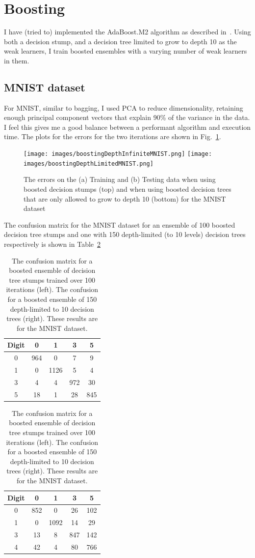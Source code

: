 \documentclass[5pt]{article}
\begin{document}
\section{Boosting}
I have (tried to) implemented the AdaBoost.M2 algorithm as described
in~\cite{freund1996experiments}. Using both a decision stump, and a decision
tree limited to grow to depth 10 as the weak learners, I train boosted
ensembles
with a varying number of weak learners in them.

\subsection{MNIST dataset}
For MNIST, similar to bagging, I used PCA to reduce dimensionality, retaining
enough principal component vectors that explain 90\% of the variance in the
data. I feel this gives me a good balance between a performant algorithm and
execution time.  The plots for the errors for the two iterations are shown in
Fig.~\ref{fig:errorsMNISTBoosting}.

\begin{figure}
  \texttt{[image: images/boostingDepthInfiniteMNIST.png]}
  \texttt{[image: images/boostingDepthLimitedMNIST.png]}
\label{fig:errorsMNISTBoosting}
\caption{The errors on the (a) Training and (b) Testing data when
  using boosted decision stumps (top) and when using boosted decision trees
that are only allowed to grow to depth 10 (bottom) for the MNIST dataset}
\end{figure}

The confusion matrix for the MNIST dataset for an ensemble of 100 boosted
decision tree stumps and one with 150 depth-limited (to 10 levels)
decision trees respectively is shown in Table~\ref{tab:confusionMNISTBoost}
\begin{table}
\centering
\begin{tabular}{ccccc}
\toprule
Digit & 0 & 1 & 3 & 5 \\
\midrule
0 & 964 & 0 & 7 & 9\\
1 & 0 & 1126 & 5 & 4\\
3 & 4 & 4 & 972 & 30\\
5 & 18 & 1 & 28 & 845\\
\bottomrule
\end{tabular}
\quad
\begin{tabular}{ccccc}
\toprule
Digit & 0 & 1 & 3 & 5\\
\midrule
0 & 852 & 0 & 26 & 102\\
1 & 0  & 1092 &  14 & 29\\
3 & 13 & 8 & 847 & 142\\
4 & 42 & 4 & 80 & 766\\
\bottomrule
\end{tabular}
\caption{The confusion matrix for a boosted ensemble of decision tree stumps
  trained over 100 iterations (left). The confusion for a boosted ensemble of
  150 depth-limited to 10 decision trees (right). These results are for the MNIST
dataset.}
\label{tab:confusionMNISTBoost}
\end{table}
\end{document}
